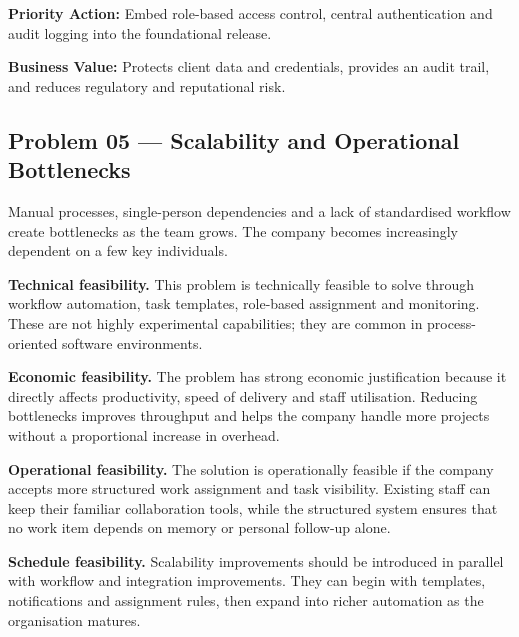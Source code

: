 \documentclass[12pt,a4paper]{report}
\begin{document}
\begin{recommendBox}
\textbf{Priority Action:} Embed role-based access control, central authentication and audit logging into the foundational release.

\textbf{Business Value:} Protects client data and credentials, provides an audit trail, and reduces regulatory and reputational risk.
\end{recommendBox}

\subsection{Problem 05 --- Scalability and Operational Bottlenecks}

\begin{problemBox}
Manual processes, single-person dependencies and a lack of standardised workflow create bottlenecks as the team grows. The company becomes increasingly dependent on a few key individuals.
\end{problemBox}

\textbf{Technical feasibility.} This problem is technically feasible to solve through workflow automation, task templates, role-based assignment and monitoring. These are not highly experimental capabilities; they are common in process-oriented software environments.

\textbf{Economic feasibility.} The problem has strong economic justification because it directly affects productivity, speed of delivery and staff utilisation. Reducing bottlenecks improves throughput and helps the company handle more projects without a proportional increase in overhead.

\textbf{Operational feasibility.} The solution is operationally feasible if the company accepts more structured work assignment and task visibility. Existing staff can keep their familiar collaboration tools, while the structured system ensures that no work item depends on memory or personal follow-up alone.

\textbf{Schedule feasibility.} Scalability improvements should be introduced in parallel with workflow and integration improvements. They can begin with templates, notifications and assignment rules, then expand into richer automation as the organisation matures.
\end{document}
